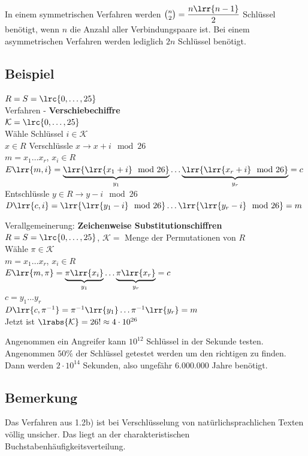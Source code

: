 		In einem symmetrischen Verfahren werden $\binom{n}{2}=\dfrac{n\lrr{n-1}}{2}$ Schlüssel benötigt, wenn $n$ die Anzahl aller Verbindungspaare ist. Bei einem asymmetrischen Verfahren werden lediglich $2n$ Schlüssel benötigt.
		
	\subsection{Beispiel}
			\item $R=S=\lrc{0,\dots,25}$ \\
				Verfahren - \textbf{Verschiebechiffre}\\
				$\mathcal{K}=\lrc{0,\dots,25}$ \\
				Wähle Schlüssel $i\in\mathcal{K}$\\
				$x\in R$ Verschlüssle $x\rightarrow x+i\mod 26$\\
				$m=x_1\dots x_r$, $x_i\in R$\\
				$E\lrr{m,i}=\underbrace{\lrr{\lrr{x_1+i}\mod 26}}_{y_1}\dots\underbrace{\lrr{\lrr{x_r+i}\mod 26}}_{y_r}=c$\\
				Entschlüssle $y\in R \rightarrow y-i\mod 26$\\
				$D\lrr{c,i}=\lrr{\lrr{y_1-i}\mod 26}\dots\lrr{\lrr{y_r-i}\mod 26}=m$
			\item Verallgemeinerung: \textbf{Zeichenweise Substitutionschiffren}\\
				$R=S=\lrc{0,\dots,25}$, $\mathcal{K}=$ Menge der Permutationen von $R$\\
				Wähle $\pi\in\mathcal{K}$\\
				$m=x_1\dots x_r$, $x_i\in R$\\
				$E\lrr{m,\pi}=\underbrace{\pi\lrr{x_i}}_{y_1}\dots\underbrace{\pi\lrr{x_r}}_{y_r}=c$\\
				$c=y_1\dots y_r$\\
				$D\lrr{c,\pi^{-1}}=\pi^{-1}\lrr{y_1}\dots\pi^{-1}\lrr{y_r}=m$\\
				Jetzt ist $\lrabs{\mathcal{K}}=26!\approx 4\cdot10^{26}$
			
				Angenommen ein Angreifer kann $10^{12}$ Schlüssel in der Sekunde testen.\\
				Angenommen $50\%$ der Schlüssel getestet werden um den richtigen zu finden.\\
				Dann werden $2\cdot 10^{14}$ Sekunden, also ungefähr $6.000.000$ Jahre benötigt.
		\subExEnd
		
	\subsection{Bemerkung}
		Das Verfahren aus 1.2b) ist bei Verschlüsselung von natürlichsprachlichen Texten völlig unsicher. Das liegt an der charakteristischen Buchstabenhäufigkeitsverteilung.
		
